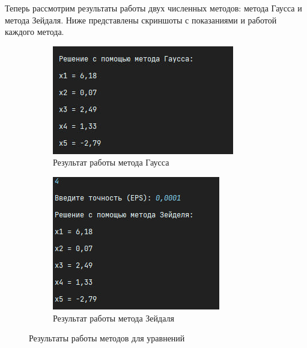 \documentclass[12pt]{article}
\begin{document}
Теперь рассмотрим результаты работы двух численных методов: метода Гаусса и метода Зейдаля. Ниже представлены скриншоты с показаниями и работой каждого метода.

\begin{figure}[ht]
  \centering
  \begin{subfigure}{0.4\textwidth}
    \includegraphics[width=\linewidth]{gauss_equation.png}
    \caption{Результат работы метода Гаусса}
  \end{subfigure}
  \hfill
  \begin{subfigure}{0.4\textwidth}
    \includegraphics[width=\linewidth]{zeidel_equation.png}
    \caption{Результат работы метода Зейдаля}
  \end{subfigure}
  \caption{Результаты работы методов для уравнений}
\end{figure}
\end{document}
